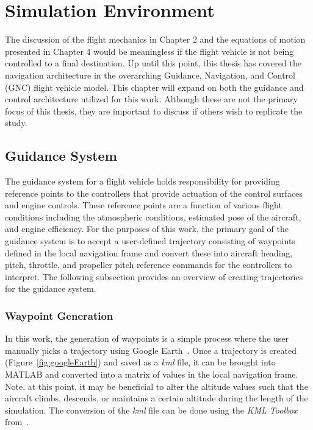 \chapter{\textbf{Simulation Environment}}
The discussion of the flight mechanics in Chapter 2 and the equations of motion presented in Chapter 4 would be meaningless if the flight vehicle is not being controlled to a final destination. Up until this point, this thesis has covered the navigation architecture in the overarching Guidance, Navigation, and Control (GNC) flight vehicle model. This chapter will expand on both the guidance and control architecture utilized for this work. Although these are not the primary focus of this thesis, they are important to discuss if others wish to replicate the study.

\section{\textbf{Guidance System}}
The guidance system for a flight vehicle holds responsibility for providing reference points to the controllers that provide actuation of the control surfaces and engine controls. These reference points are a function of various flight conditions including the atmospheric conditions, estimated pose of the aircraft, and engine efficiency. For the purposes of this work, the primary goal of the guidance system is to accept a user-defined trajectory consisting of waypoints defined in the local navigation frame and convert these into aircraft heading, pitch, throttle, and propeller pitch reference commands for the controllers to interpret. The following subsection provides an overview of creating trajectories for the guidance system.

\subsection{\textbf{Waypoint Generation}}
In this work, the generation of waypoints is a simple process where the user manually picks a trajectory using Google Earth~\cite{GoogleEarth1969}. Once a trajectory is created (Figure~\ref{fig:googleEarth}) and saved as a \textit{kml} file, it can be brought into MATLAB and converted into a matrix of values in the local navigation frame. Note, at this point, it may be beneficial to alter the altitude values such that the aircraft climbs, descends, or maintains a certain altitude during the length of the simulation. The conversion of the \textit{kml} file can be done using the \textit{KML Toolbox} from~\cite{KMLToolboxFile1969}.

